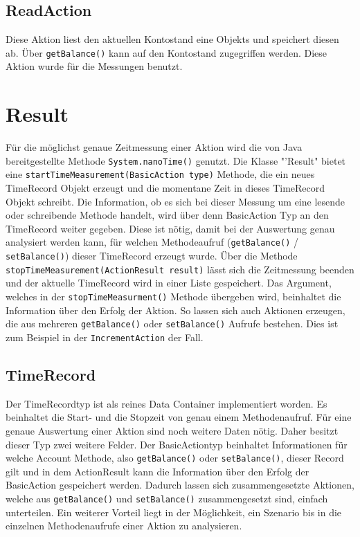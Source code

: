 \subsection{ReadAction}
\label{sec:readAction}
Diese Aktion liest den aktuellen Kontostand eine Objekts und speichert diesen ab. Über \verb+getBalance()+ kann auf den Kontostand zugegriffen werden. Diese Aktion wurde für die Messungen benutzt.

\section{Result}
\label{sec:result}
Für die möglichst genaue Zeitmessung einer Aktion wird die von Java bereitgestellte Methode \verb+System.nanoTime()+ genutzt. Die Klasse "'Result" bietet eine \verb+startTimeMeasurement(BasicAction type)+ Methode, die ein neues TimeRecord Objekt erzeugt und die momentane Zeit in dieses TimeRecord Objekt schreibt. Die Information, ob es sich bei dieser Messung um eine lesende oder schreibende Methode handelt, wird über denn BasicAction Typ an den TimeRecord weiter gegeben. Diese ist nötig, damit bei der Auswertung genau analysiert werden kann, für welchen Methodeaufruf (\verb+getBalance()+ / \verb+setBalance()+) dieser TimeRecord erzeugt wurde. Über die Methode \verb+stopTimeMeasurement(ActionResult result)+ lässt sich die Zeitmessung beenden und der aktuelle TimeRecord wird in einer Liste gespeichert. Das Argument, welches in der \verb+stopTimeMeasurment()+ Methode üb\-er\-geb\-en wird, beinhaltet die Information über den Erfolg der Aktion. So lassen sich auch Aktionen erzeugen, die aus mehreren \verb+getBalance()+ oder \verb+setBalance()+ Aufrufe bestehen. Dies ist zum Beispiel in der \texttt{Increment\allowbreak Action} der Fall.

\subsection{TimeRecord}
\label{sec:timeRecord}
Der TimeRecordtyp ist als reines Data Container implementiert worden. Es beinhaltet die Start- und die Stopzeit von genau einem Methodenaufruf. Für eine genaue Auswertung einer Aktion sind noch weitere Daten nötig. Daher besitzt dieser Typ zwei weitere Felder. Der BasicActiontyp beinhaltet Informationen für welche Account Methode, also \verb+getBalance()+ oder \verb+setBalance()+, dieser Record gilt und in dem ActionResult kann die Information über den Erfolg der BasicAction gespeichert werden. Dadurch lassen sich zusammengesetzte Aktionen, welche aus \verb+getBalance()+ und \verb+setBalance()+ zusammengesetzt sind, einfach unterteilen. Ein weiterer Vorteil liegt in der Möglichkeit, ein Szenario bis in die einzelnen Methodenaufrufe einer Aktion zu analysieren.


